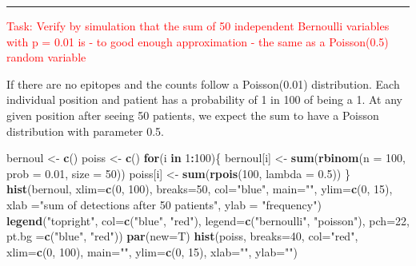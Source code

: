 \documentclass[]{article}
\newenvironment{Shaded}{\begin{snugshade}}{\end{snugshade}}
\newcommand{\KeywordTok}[1]{\textcolor[rgb]{0.13,0.29,0.53}{\textbf{#1}}}
\newcommand{\DataTypeTok}[1]{\textcolor[rgb]{0.13,0.29,0.53}{#1}}
\newcommand{\DecValTok}[1]{\textcolor[rgb]{0.00,0.00,0.81}{#1}}
\newcommand{\FloatTok}[1]{\textcolor[rgb]{0.00,0.00,0.81}{#1}}
\newcommand{\StringTok}[1]{\textcolor[rgb]{0.31,0.60,0.02}{#1}}
\newcommand{\ControlFlowTok}[1]{\textcolor[rgb]{0.13,0.29,0.53}{\textbf{#1}}}
\newcommand{\OperatorTok}[1]{\textcolor[rgb]{0.81,0.36,0.00}{\textbf{#1}}}
\newcommand{\NormalTok}[1]{#1}
\let\oldrule=\rule
\renewcommand{\rule}[1]{\oldrule{\linewidth}}
\begin{document}
\begin{center}\rule{0.5\linewidth}{\linethickness}\end{center}

\textcolor{red}{Task: Verify by simulation that the sum of 50 independent Bernoulli variables with p = 0.01 is - to good enough approximation - the same as a Poisson(0.5) random variable}

If there are no epitopes and the counts follow a Poisson(0.01)
distribution. Each individual position and patient has a probability of
1 in 100 of being a 1. At any given position after seeing 50 patients,
we expect the sum to have a Poisson distribution with parameter 0.5.

\begin{Shaded}
\begin{Highlighting}[]
\NormalTok{bernoul <-}\StringTok{ }\KeywordTok{c}\NormalTok{()}
\NormalTok{poiss <-}\StringTok{ }\KeywordTok{c}\NormalTok{()}
\ControlFlowTok{for}\NormalTok{(i }\ControlFlowTok{in} \DecValTok{1}\OperatorTok{:}\DecValTok{100}\NormalTok{)\{}
\NormalTok{  bernoul[i] <-}\StringTok{ }\KeywordTok{sum}\NormalTok{(}\KeywordTok{rbinom}\NormalTok{(}\DataTypeTok{n =} \DecValTok{100}\NormalTok{, }\DataTypeTok{prob =} \FloatTok{0.01}\NormalTok{, }\DataTypeTok{size =} \DecValTok{50}\NormalTok{))}
\NormalTok{  poiss[i] <-}\StringTok{ }\KeywordTok{sum}\NormalTok{(}\KeywordTok{rpois}\NormalTok{(}\DecValTok{100}\NormalTok{, }\DataTypeTok{lambda =} \FloatTok{0.5}\NormalTok{))}
\NormalTok{\}}
\KeywordTok{hist}\NormalTok{(bernoul, }\DataTypeTok{xlim=}\KeywordTok{c}\NormalTok{(}\DecValTok{0}\NormalTok{, }\DecValTok{100}\NormalTok{), }\DataTypeTok{breaks=}\DecValTok{50}\NormalTok{, }\DataTypeTok{col=}\StringTok{"blue"}\NormalTok{, }\DataTypeTok{main=}\StringTok{""}\NormalTok{, }\DataTypeTok{ylim=}\KeywordTok{c}\NormalTok{(}\DecValTok{0}\NormalTok{, }\DecValTok{15}\NormalTok{), }\DataTypeTok{xlab =}\StringTok{"sum of detections after 50 patients"}\NormalTok{, }\DataTypeTok{ylab =} \StringTok{"frequency"}\NormalTok{)}
\KeywordTok{legend}\NormalTok{(}\StringTok{"topright"}\NormalTok{, }\DataTypeTok{col=}\KeywordTok{c}\NormalTok{(}\StringTok{"blue"}\NormalTok{, }\StringTok{"red"}\NormalTok{), }\DataTypeTok{legend=}\KeywordTok{c}\NormalTok{(}\StringTok{"bernoulli"}\NormalTok{, }\StringTok{"poisson"}\NormalTok{), }\DataTypeTok{pch=}\DecValTok{22}\NormalTok{, }\DataTypeTok{pt.bg =}\KeywordTok{c}\NormalTok{(}\StringTok{"blue"}\NormalTok{, }\StringTok{"red"}\NormalTok{))}
\KeywordTok{par}\NormalTok{(}\DataTypeTok{new=}\NormalTok{T)}
\KeywordTok{hist}\NormalTok{(poiss, }\DataTypeTok{breaks=}\DecValTok{40}\NormalTok{, }\DataTypeTok{col=}\StringTok{"red"}\NormalTok{, }\DataTypeTok{xlim=}\KeywordTok{c}\NormalTok{(}\DecValTok{0}\NormalTok{, }\DecValTok{100}\NormalTok{), }\DataTypeTok{main=}\StringTok{""}\NormalTok{, }\DataTypeTok{ylim=}\KeywordTok{c}\NormalTok{(}\DecValTok{0}\NormalTok{, }\DecValTok{15}\NormalTok{), }\DataTypeTok{xlab=}\StringTok{""}\NormalTok{, }\DataTypeTok{ylab=}\StringTok{""}\NormalTok{)}
\end{Highlighting}
\end{Shaded}
\end{document}
